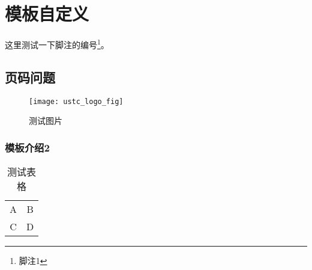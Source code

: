\chapter{模板自定义}
这里测试一下脚注的编号\footnote{脚注1}。
\section{页码问题}
\begin{figure}[ht]
\centering
\caption{测试图片}
\texttt{[image: ustc\_logo\_fig]}
\end{figure}

\subsection{模板介绍2}
\begin{table}[ht]
\centering
\caption{测试表格}
\begin{tabular}{cc}
A   &   B   \\
C   &   D   \\
\end{tabular}
\end{table}
